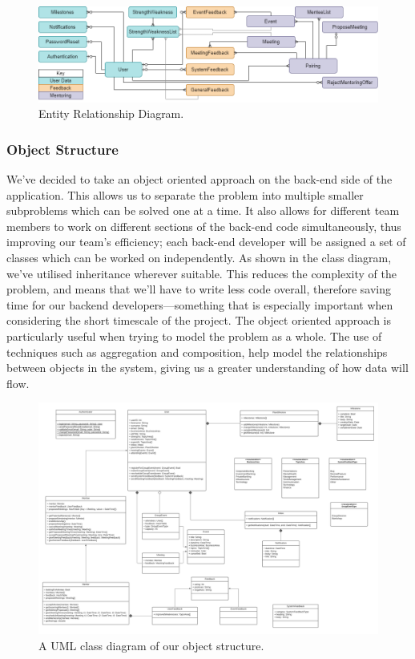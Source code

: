 \documentclass[10pt]{article}
\begin{document}
\begin{figure}[H]
    \centering
    \includegraphics[width=1\textwidth]{ER}
    \caption{Entity Relationship Diagram.}
    \label{fig:Entity Diagram}
\end{figure}


\subsubsection{Object Structure}
We've decided to take an object oriented approach on the back-end side of the
application. This allows us to separate the problem into multiple smaller
subproblems which can be solved one at a time. It also allows for different team
members to work on different sections of the back-end code simultaneously, thus
improving our team's efficiency; each back-end developer will be assigned a set
of classes which can be worked on independently. As shown in the class diagram,
we've utilised inheritance wherever suitable. This reduces the complexity of the
problem, and means that we'll have to write less code overall, therefore saving
time for our backend developers—something that is especially important when
considering the short timescale of the project. The object oriented approach is
particularly useful when trying to model the problem as a whole. The use of
techniques such as aggregation and composition, help model the relationships
between objects in the system, giving us a greater understanding of how data
will flow.

\begin{figure}[H]
    \centering
    \includegraphics[width=1\textwidth]{Objects}
    \caption{A UML class diagram of our object structure.}
    \label{fig:uml_class_diagram}
\end{figure}
\end{document}
